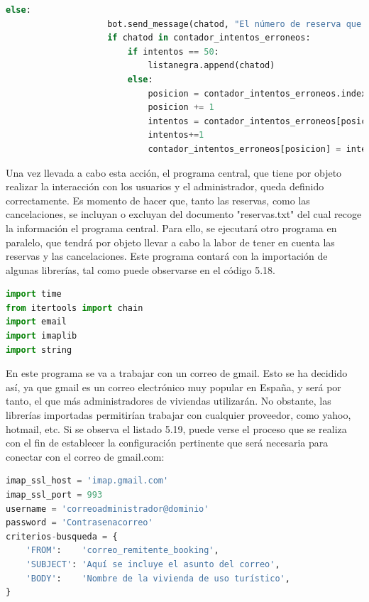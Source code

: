 \begin{lstlisting}[language=Python,
    caption={Limitación de intentos para acceder a la vivienda},
    label=src:limite-de-intentos
]
                else:                    
                    bot.send_message(chatod, "El número de reserva que has introducido no es correcto, por favor, inténtelo de nuevo")
                    if chatod in contador_intentos_erroneos:
                        if intentos == 50:
                            listanegra.append(chatod)
                        else:
                            posicion = contador_intentos_erroneos.index(chatod)
                            posicion += 1
                            intentos = contador_intentos_erroneos[posicion]
                            intentos+=1
                            contador_intentos_erroneos[posicion] = intentos
\end{lstlisting}
Una vez llevada a cabo esta acción, el programa central, que tiene por objeto realizar la interacción con los usuarios y el administrador, queda definido correctamente.
Es momento de hacer que, tanto las reservas, como las cancelaciones, se incluyan o excluyan del documento "reservas.txt" del cual recoge la información el programa central.
Para ello, se ejecutará otro programa en paralelo, que tendrá por objeto llevar a cabo la labor de tener en cuenta las reservas y las cancelaciones. Este programa contará con la importación de algunas librerías, tal como puede observarse en el código 5.18.
\begin{lstlisting}[language=Python,
    caption={Importación de librerias para programa de reservas y cancelaciones},
    label=src:importacion-librerias-reservas-y-cancelaciones
]
import time
from itertools import chain
import email
import imaplib
import string
\end{lstlisting}
En este programa se va a trabajar con un correo de gmail. Esto se ha decidido así, ya que gmail es un correo electrónico muy popular en España, y será por tanto, el que más administradores de viviendas utilizarán. No obstante, las librerías importadas permitirían trabajar con cualquier proveedor, como yahoo, hotmail, etc.
Si se observa el listado 5.19, puede verse el proceso que se realiza con el fin de establecer la configuración pertinente que será necesaria para conectar con el correo de gmail.com:
\begin{lstlisting}[language=Python,
    caption={Configuración de gmail},
    label=src:configuracion-de-gmail
]
imap_ssl_host = 'imap.gmail.com'
imap_ssl_port = 993
username = 'correoadministrador@dominio'
password = 'Contrasenacorreo'
criterios-busqueda = {
    'FROM':    'correo_remitente_booking',
    'SUBJECT': 'Aquí se incluye el asunto del correo',
    'BODY':    'Nombre de la vivienda de uso turístico',
}
\end{lstlisting}
